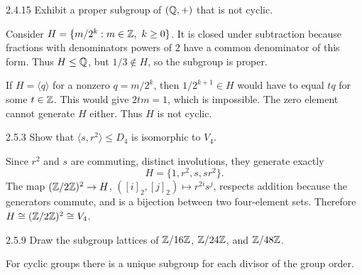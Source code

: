 \documentclass[11pt,oneside]{article}
\begin{document}
\begin{exercise}{2.4.15}
Exhibit a proper subgroup of $(\mathbb{Q},+)$ that is not cyclic.
\end{exercise}

\begin{solution}
Consider $H=\{m/2^k:m\in\Z,\ k\ge0\}$. It is closed under subtraction because fractions with denominators powers of $2$ have a common denominator of this form. Thus $H\le\mathbb{Q}$, but $1/3\notin H$, so the subgroup is proper.

If $H=\langle q\rangle$ for a nonzero $q=m/2^k$, then $1/2^{k+1}\in H$ would have to equal $tq$ for some $t\in\mathbb{Z}$. This would give $2tm=1$, which is impossible. The zero element cannot generate $H$ either. Thus $H$ is not cyclic.
\end{solution}

\begin{exercise}{2.5.3}
Show that $\langle s,r^2\rangle\le D_4$ is isomorphic to $V_4$.
\end{exercise}

\begin{solution}
Since $r^2$ and $s$ are commuting, distinct involutions, they generate exactly
\[
 H=\{1,r^2,s,sr^2\}.
\]
The map $(\mathbb{Z}/2\mathbb{Z})^2\to H$, $([i]_2,[j]_2)\mapsto r^{2i}s^j$, respects addition because the generators commute, and is a bijection between two four-element sets. Therefore $H\cong(\mathbb{Z}/2\mathbb{Z})^2\cong V_4$.
\end{solution}

\begin{exercise}{2.5.9}
Draw the subgroup lattices of $\mathbb{Z}/16\mathbb{Z}$, $\mathbb{Z}/24\mathbb{Z}$, and $\mathbb{Z}/48\mathbb{Z}$.
\end{exercise}

\begin{hint}
For cyclic groups there is a unique subgroup for each divisor of the group order.
\end{hint}
\end{document}
